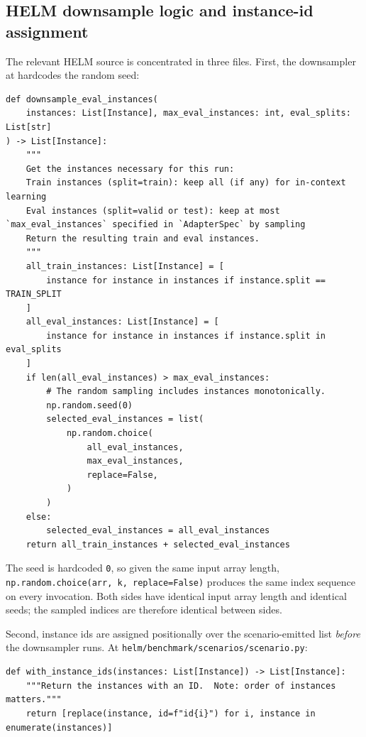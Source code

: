 \documentclass[11pt]{article}
\begin{document}
\subsection{HELM downsample logic and instance-id assignment}
\label{sec:tr-case-a-helm-internals}

The relevant HELM source is concentrated in three files.
First, the downsampler at
  hardcodes the random seed:

\begin{lstlisting}[style=python, caption={HELM v0.3.0 / v0.5.x \path{runner.py:downsample_eval_instances}.\label{lst:tr-helm-downsample}}]
def downsample_eval_instances(
    instances: List[Instance], max_eval_instances: int, eval_splits: List[str]
) -> List[Instance]:
    """
    Get the instances necessary for this run:
    Train instances (split=train): keep all (if any) for in-context learning
    Eval instances (split=valid or test): keep at most `max_eval_instances` specified in `AdapterSpec` by sampling
    Return the resulting train and eval instances.
    """
    all_train_instances: List[Instance] = [
        instance for instance in instances if instance.split == TRAIN_SPLIT
    ]
    all_eval_instances: List[Instance] = [
        instance for instance in instances if instance.split in eval_splits
    ]
    if len(all_eval_instances) > max_eval_instances:
        # The random sampling includes instances monotonically.
        np.random.seed(0)
        selected_eval_instances = list(
            np.random.choice(
                all_eval_instances,
                max_eval_instances,
                replace=False,
            )
        )
    else:
        selected_eval_instances = all_eval_instances
    return all_train_instances + selected_eval_instances
\end{lstlisting}

The seed is hardcoded \texttt{0}, so given the same input array length,
  \texttt{np.random.choice(arr, k, replace=False)} produces the same
  index sequence on every invocation.
Both sides have identical input array length and identical seeds; the
  sampled indices are therefore identical between sides.

Second, instance ids are assigned positionally over the
  scenario-emitted list \emph{before} the downsampler runs.
At \texttt{helm/benchmark/scenarios/scenario.py}:

\begin{lstlisting}[style=python, caption={HELM \path{scenario.py:with_instance_ids}.\label{lst:tr-helm-with-instance-ids}}]
def with_instance_ids(instances: List[Instance]) -> List[Instance]:
    """Return the instances with an ID.  Note: order of instances matters."""
    return [replace(instance, id=f"id{i}") for i, instance in enumerate(instances)]
\end{lstlisting}
\end{document}
